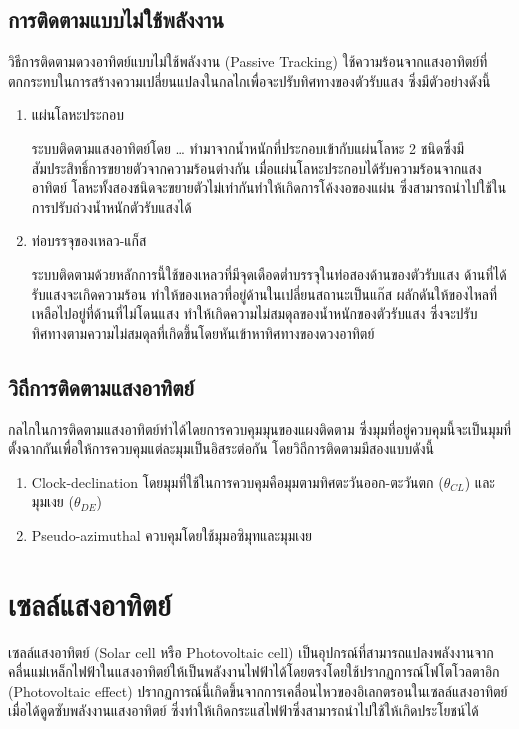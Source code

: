 \documentclass[a4paper,nobib,openany,10pt]{tufte-book}
\begin{document}
\section{การติดตามแบบไม่ใช้พลังงาน}
\label{sec:org2a2187e}
วิธีการติดตามดวงอาทิตย์แบบไม่ใช้พลังงาน (Passive Tracking)
ใช้ความร้อนจากแสงอาทิตย์ที่ตกกระทบในการสร้างความเปลี่ยนแปลงในกลไกเพื่อจะปรับทิศทางของตัวรับแสง
ซึ่งมีตัวอย่างดังนี้

\begin{enumerate}
\item แผ่นโลหะประกอบ

ระบบติดตามแสงอาทิตย์โดย \ldots{} ทำมาจากน้ำหนักที่ประกอบเข้ากับแผ่นโลหะ 2
ชนิดซึ่งมีสัมประสิทธิ์การขยายตัวจากความร้อนต่างกัน
เมื่อแผ่นโลหะประกอบได้รับความร้อนจากแสงอาทิตย์
โลหะทั้งสองชนิดจะขยายตัวไม่เท่ากันทำให้เกิดการโค้งงอของแผ่น
ซึ่งสามารถนำไปใช้ในการปรับถ่วงน้ำหนักตัวรับแสงได้

\item ท่อบรรจุของเหลว-แก็ส

ระบบติดตามด้วยหลักการนี้ใช้ของเหลวที่มีจุดเดือดต่ำบรรจุในท่อสองด้านของตัวรับแสง
ด้านที่ได้รับแสงจะเกิดความร้อน
ทำให้ของเหลวที่อยู่ด้านในเปลี่ยนสถานะเป็นแก๊ส
ผลักดันให้ของไหลที่เหลือไปอยู่ที่ด้านที่ไม่โดนแสง
ทำให้เกิดความไม่สมดุลของน้ำหนักของตัวรับแสง
ซึ่งจะปรับทิศทางตามความไม่สมดุลที่เกิดขึ้นโดยหันเข้าหาทิศทางของดวงอาทิตย์
\end{enumerate}

\section{วิถีการติดตามแสงอาทิตย์}
\label{sec:org0f9f39e}
กลไกในการติดตามแสงอาทิตย์ทำได้ไดยการควบคุมมุนของแผงติดตาม
ซึ่งมุมที่อยู่ควบคุมนี้จะเป็นมุมที่ตั้งฉากกันเพื่อให้การควบคุมแต่ละมุมเป็นอิสระต่อกัน
โดยวิถีการติดตามมีสองแบบดังนี้

\begin{enumerate}
\item Clock-declination โดยมุมที่ใช้ในการควบคุมคือมุมตามทิศตะวันออก-ตะวันตก
(\(\theta_{CL}\)) และมุมเงย (\(\theta_{DE}\))

\item Pseudo-azimuthal ควบคุมโดยใช้มุมอซิมุทและมุมเงย
\end{enumerate}

\chapter{เซลล์แสงอาทิตย์}
\label{sec:orgb949ce8}

เซลล์แสงอาทิตย์ (Solar cell หรือ Photovoltaic cell)
เป็นอุปกรณ์ที่สามารถแปลงพลังงานจากคลื่นแม่เหล็กไฟฟ้าในแสงอาทิตย์ให้เป็นพลังงานไฟฟ้าได้โดยตรงโดยใช้ปรากฏการณ์โฟโตโวลตาอิก
(Photovoltaic effect)
ปรากฏการณ์นี้เกิดขึ้นจากการเคลื่อนไหวของอิเลกตรอนในเซลล์แสงอาทิตย์เมื่อได้ดูดซับพลังงานแสงอาทิตย์
ซึ่งทำให้เกิดกระแสไฟฟ้าซึ่งสามารถนำไปใช้ให้เกิดประโยชน์ได้
\end{document}
